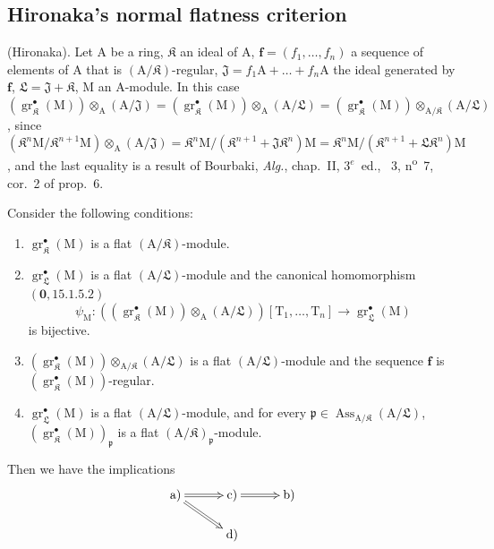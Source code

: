 \subsection{Hironaka's normal flatness criterion}
\label{subsection:IV.19.7}
\label{IV.19.7}

\begin{theorem}[19.7.1]
\label{IV.19.7.1}
\textup{(Hironaka).}
Let $\mathrm{A}$ be a ring, $\mathfrak K$ an ideal of $\mathrm{A}$, $\mathbf{f}=(f_1,\ldots,f_n)$ a sequence of elements of $\mathrm{A}$ that is $(\mathrm{A}/\mathfrak K)$-regular, $\mathfrak{J}=f_1\mathrm{A}+\ldots+f_n\mathrm{A}$ the ideal generated by $\mathbf{f}$, $\mathfrak{L}=\mathfrak{J}+\mathfrak K$, $\mathrm{M}$ an $\mathrm{A}$-module.
In this case $(\operatorname{gr}_\mathfrak K^\bullet(\mathrm{M}))\otimes_\mathrm{A}(\mathrm{A}/\mathfrak{J})=(\operatorname{gr}_\mathfrak K^\bullet(\mathrm{M}))\otimes_\mathrm{A}(\mathrm{A}/\mathfrak{L})=(\operatorname{gr}_\mathfrak K^\bullet(\mathrm{M}))\otimes_{\mathrm{A}/\mathfrak K}(\mathrm{A}/\mathfrak{L})$, since $(\mathfrak K^n\mathrm{M}/\mathfrak K^{n+1}\mathrm{M})\otimes_\mathrm{A}(\mathrm{A}/\mathfrak{J})=\mathfrak K^n\mathrm{M}/(\mathfrak K^{n+1}+\mathfrak{J}\mathfrak K^n)\mathrm{M}=\mathfrak K^n\mathrm{M}/(\mathfrak K^{n+1}+\mathfrak{L}\mathfrak K^n)\mathrm{M}$, and the last equality is a result of \textup{Bourbaki, \emph{Alg.}, chap.~II, $3^e$~ed., \textsection~3, n\textsuperscript{o}~7, cor.~2 of prop.~6}.

Consider the following conditions:
\begin{enumerate}
\item[\rm a)] $\operatorname{gr}_\mathfrak K^\bullet(\mathrm{M})$ is a flat $(\mathrm{A}/\mathfrak K)$-module.
\item[\rm b)] $\operatorname{gr}_\mathfrak{L}^\bullet(\mathrm{M})$ is a flat $(\mathrm{A}/\mathfrak{L})$-module and the canonical homomorphism $(\mathbf{0},15.1.5.2)$
\[
  \psi_\mathrm{M}:((\operatorname{gr}_\mathfrak K^\bullet(\mathrm{M}))\otimes_\mathrm{A}(\mathrm{A}/\mathfrak{L}))[\mathrm{T}_1,\ldots,\mathrm{T}_n]\to\operatorname{gr}_\mathfrak{L}^\bullet(\mathrm{M})
\]
is bijective.
\item[\rm c)] $(\operatorname{gr}_\mathfrak K^\bullet(\mathrm{M}))\otimes_{\mathrm{A}/\mathfrak K}(\mathrm{A}/\mathfrak{L})$ is a flat $(\mathrm{A}/\mathfrak{L})$-module and the sequence $\mathbf{f}$ is $(\operatorname{gr}_\mathfrak K^\bullet(\mathrm{M}))$-regular.
\item[\rm d)] $\operatorname{gr}_\mathfrak{L}^\bullet(\mathrm{M})$ is a flat $(\mathrm{A}/\mathfrak{L})$-module, and for every $\mathfrak{p}\in\operatorname{Ass}_{\mathrm{A}/\mathfrak K}(\mathrm{A}/\mathfrak{L})$, $(\operatorname{gr}_\mathfrak K^\bullet(\mathrm{M}))_\mathfrak{p}$ is a flat $(\mathrm{A}/\mathfrak K)_\mathfrak{p}$-module.
\end{enumerate}
Then we have the implications
\[
\xymatrix@C=3em@R=1.6em{
  \textup{a)} \ar@{=>}[r] \ar@{=>}[dr] & \textup{c)} \ar@{=>}[r] & \textup{b)} \\
  & \textup{d)}
}
\]


\end{theorem}
